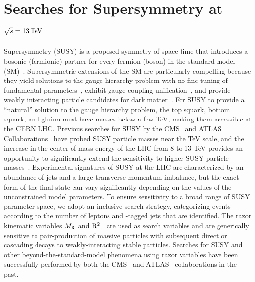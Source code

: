 \chapter{Searches for Supersymmetry at $\sqrt{s}=13\,\text{Te\hspace{-.08em}V}$}

\label{sec:intro}
Supersymmetry (SUSY) is a proposed symmetry of space-time that 
introduces a bosonic (fermionic) partner for every fermion (boson) in the 
standard model (SM)~\cite{Wess,Golfand,Volkov,Chamseddine,Kane,Fayet,Barbieri,Hall,Ramond}.
Supersymmetric extensions of the SM are particularly compelling 
because they yield solutions to the gauge hierarchy problem with no
fine-tuning of fundamental parameters~\cite{Witten:1981nf,Dimopoulos:1981zb,Dine:1981za,Dimopoulos:1981au,Sakai:1981gr,Kaul:1981hi}, 
exhibit gauge coupling unification~\cite{Dimopoulos:1981yj,Marciano:1981un,Einhorn:1981sx,Ibanez:1981yh,Amaldi:1991cn,Langacker:1995fk},
and provide weakly interacting particle candidates for dark matter~\cite{Ellis:1983ew,Jungman:1995df}.
For SUSY to provide a ``natural'' solution to the gauge hierarchy problem,
the top squark, bottom squark, and gluino must have masses below a few
TeV, making them accessible at the CERN LHC. Previous searches for SUSY by the
CMS~\cite{1LepMVA,SUS12024,Chatrchyan:2014lfa,Chatrchyan:2013iqa,Chatrchyan:2013fea,Chatrchyan:2013lya,MT2at8TeV}
and ATLAS Collaborations~\cite{Aad:2013wta,Aad:2014lra,Aad:2014pda,Aad:2014bva,Aad:2014qaa,Atlas3rdGen,Atlas8tevSummary}
have probed SUSY particle masses near the TeV scale, and the increase in the center-of-mass
energy of the LHC from 8 to 13 TeV provides an opportunity to
significantly extend the sensitivity to higher SUSY particle masses~\cite{atlasFullHad13TeV,RA2b13TeV,MT213TeV}.
Experimental signatures of SUSY at the LHC are characterized by an abundance of jets
and a large transverse momentum imbalance, but the exact form of the final state can vary significantly
depending on the values of the unconstrained model parameters. To ensure sensitivity 
to a broad range of SUSY parameter space, we adopt an inclusive search 
strategy, categorizing events according to the number of leptons and \cPqb-tagged jets that are 
identified. The razor kinematic variables $M_\mathrm{R}$ and $\mathrm{R}^2$~\cite{rogan,razorPRL,razorPRD} 
are used as search variables and are generically sensitive to
pair-production of massive particles with subsequent direct or cascading
decays to weakly-interacting stable particles. Searches for SUSY and
other beyond-the-standard-model phenomena using razor variables have been successfully performed by both the 
CMS~\cite{razorPRL,razorPRD,razor8TeV,Khachatryan:2016zcu,Khachatryan:2016reg} and 
ATLAS~\cite{Aad:2012naa,ATLAS-dilepton} 
collaborations in the past.


